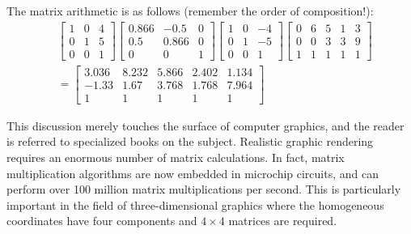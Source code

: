\documentclass{ximera}
\begin{document}
\begin{example}
\begin{explanation}

\begin{onlineOnly}
\begin{center}
\end{center}
\end{onlineOnly}

The matrix arithmetic is as follows (remember the order of composition!):
\begin{align*}
& \left[
\begin{array}{rrr}
1 & 0 & 4\\
0 & 1 & 5\\
0 & 0 & 1
\end{array}
\right]
\left[
\begin{array}{lrr}
0.866 & -0.5 & 0\\
0.5 & 0.866 & 0\\
0 & 0 & 1
\end{array}
\right]
\left[
\begin{array}{rrr}
1 & 0 & -4\\
0 & 1 & -5\\
0 & 0 & 1
\end{array}
\right]
\left[
\begin{array}{rrrrr}
0 & 6 & 5 & 1 & 3\\
0 & 0 & 3 & 3 & 9 \\
1 & 1 & 1 & 1 & 1
\end{array}
\right] \\
&= \left[
\begin{array}{lllll}
3.036 & 8.232 & 5.866 & 2.402 & 1.134\\
-1.33 & 1.67 & 3.768 & 1.768 & 7.964 \\
1 & 1 & 1 & 1 & 1
\end{array}
\right]
\end{align*}

\end{explanation}
\end{example}

This discussion merely touches the
surface of computer graphics, and the reader is referred to specialized
books on the subject. Realistic graphic rendering requires an enormous
number of matrix calculations. In fact, matrix multiplication algorithms
 are now embedded in microchip circuits, and can perform over 100
million matrix multiplications per second. This is particularly
important in the field of three-dimensional graphics where the
homogeneous coordinates have four components and $4 \times 4$ matrices are
required.
\end{document}
